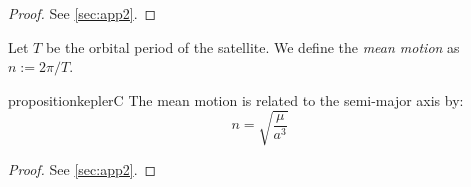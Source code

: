 \documentclass[../main.tex]{subfiles}
\begin{document}
\begin{proof}
  See \cref{sec:app2}.
\end{proof}
\begin{definition}
  Let $T$ be the orbital period of the satellite. We define the \emph{mean motion} as $n:=2\pi/T$.
\end{definition}
\begin{restatable}{proposition}{keplerC}
  \label{prop:kepler_third_law}
  The mean motion is related to the semi-major axis by:
  \begin{equation}
    n=\sqrt{\frac{\mu}{a^3}}
  \end{equation}
\end{restatable}
\begin{proof}
  See \cref{sec:app2}.
\end{proof}
\end{document}
